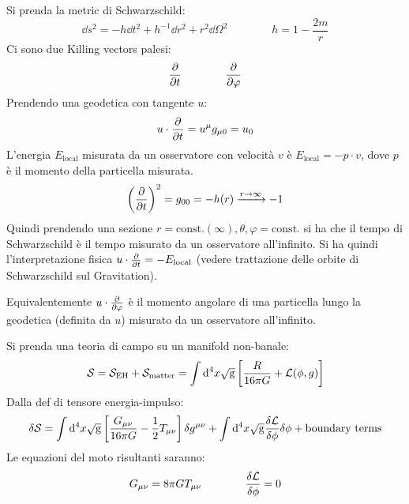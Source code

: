 \begin{example}
  Si prenda la metric di Schwarzschild:
  \begin{equation}
    \dd s^2 = - h \dd t^2 + h^{-1} \dd r^2 + r^2 \dd \Omega^2
    \qquad \qquad
    h = 1 - \frac{2m}{r}
  \end{equation}
  Ci sono due Killing vectors palesi:
  \begin{equation*}
    \frac{\partial}{\partial t}
    \qquad \qquad
    \frac{\partial}{\partial \varphi}
  \end{equation*}
  Prendendo una geodetica con tangente $ u $:
  \begin{equation*}
    u \cdot \frac{\partial}{\partial t} = u^\mu g_{\mu 0} = u_0
  \end{equation*}
  L'energia $ E_\text{local} $ misurata da un osservatore con velocità $ v $ è $ E_\text{local} = - p \cdot v $, dove $ p $ è il momento della particella misurata.
  \begin{equation*}
    \left( \frac{\partial}{\partial t} \right)^2 = g_{00} = - h(r) \xrightarrow{r \rightarrow \infty} -1
  \end{equation*}
  Quindi prendendo una sezione $ r = \text{const.} (\infty) , \theta,\varphi = \text{const.} $ si ha che il tempo di Schwarzschild è il tempo misurato da un osservatore all'infinito. Si ha quindi l'interpretazione fisica $ u \cdot \frac{\partial}{\partial t} = - E_\text{local} $ (vedere trattazione delle orbite di Schwarzschild sul Gravitation).

  Equivalentemente $ u \cdot \frac{\partial}{\partial \varphi} $ è il momento angolare di una particella lungo la geodetica (definita da $ u $) misurato da un osservatore all'infinito.
\end{example}

Si prenda una teoria di campo su un manifold non-banale:
\begin{equation}
  \mathcal{S} = \mathcal{S}_\text{EH} + \mathcal{S}_\text{matter} = \int \mathrm{d}^4x \sqrt{\mathrm{g}} \left[ \frac{R}{16\pi G} + \mathcal{L}(\phi,g) \right]
\end{equation}
Dalla def di tensore energia-impulso:
\begin{equation*}
  \delta \mathcal{S} = \int \mathrm{d}^4x \sqrt{\mathrm{g}} \left[ \frac{G_{\mu \nu}}{16\pi G} - \frac{1}{2} T_{\mu \nu} \right] \delta g^{\mu \nu} + \int \mathrm{d}^4x \sqrt{\mathrm{g}} \frac{\delta \mathcal{L}}{\delta \phi} \delta \phi + \text{boundary terms}
\end{equation*}
Le equazioni del moto risultanti saranno:
\begin{equation}
  G_{\mu \nu} = 8\pi G T_{\mu \nu}
  \qquad \qquad
  \frac{\delta \mathcal{L}}{\delta \phi} = 0
\end{equation}

